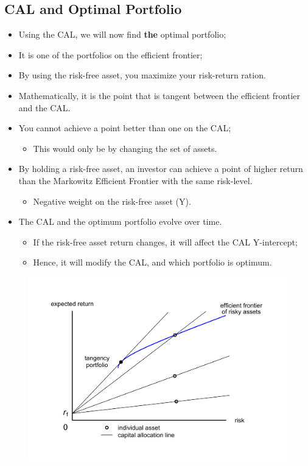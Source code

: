 \documentclass[11pt,a4paper]{report}
\begin{document}
\subsection{CAL and Optimal Portfolio}
\begin{itemize}
    \item Using the CAL, we will now find \textbf{the} optimal portfolio;
    \item It is one of the portfolios on the efficient frontier;
    \item By using the risk-free asset, you maximize your risk-return ration.
    \item Mathematically, it is the point that is tangent between the efficient frontier and the CAL.
    \item You cannot achieve a point better than one on the CAL;
    \begin{itemize}
        \item This would only be by changing the set of assets.
    \end{itemize}
    \item By holding a risk-free asset, an investor can achieve a point of higher return than the Markowitz Efficient Frontier with the same risk-level.
    \begin{itemize}
        \item Negative weight on the risk-free asset (Y).
    \end{itemize}
    \item The CAL and the optimum portfolio evolve over time.
    \begin{itemize}
        \item If the risk-free asset return changes, it will affect the CAL Y-intercept;
        \item Hence, it will modify the CAL, and which portfolio is optimum.
    \end{itemize}
\end{itemize}
\begin{figure}[h]
    \centering
    \includegraphics[width=\textwidth]{images/cap.png}
\end{figure}
\end{document}
